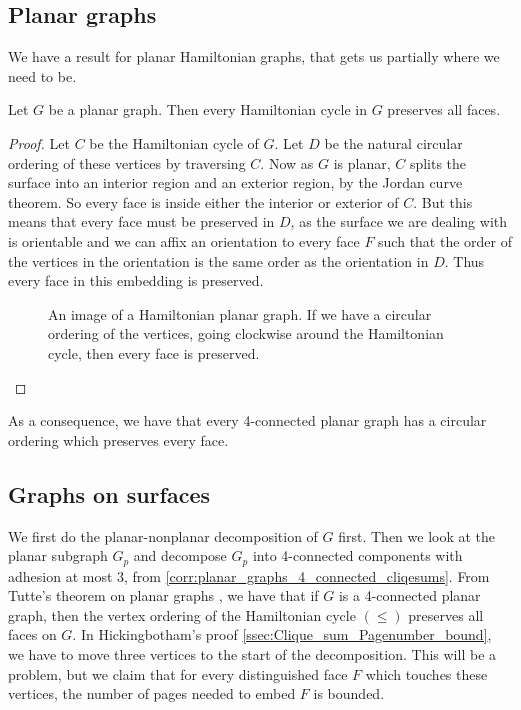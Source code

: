 \subsection{Planar graphs}

We have a result for planar Hamiltonian graphs, that gets us partially where we need to be. 
\begin{theorem}
	Let \(G\) be a planar graph. Then every Hamiltonian cycle in \(G\) preserves all faces. 
\end{theorem}

\begin{proof}
	Let \(C\) be the Hamiltonian cycle of \(G\). Let \(D\) be the natural circular ordering of these vertices by traversing \(C\). Now as \(G\) is planar, \(C\) splits the surface into an interior region and an exterior region, by the Jordan curve theorem. So every face is inside either the interior or exterior of \(C\). But this means that every face must be preserved in \(D\), as the surface we are dealing with is orientable and we can affix an orientation to every face \(F\) such that the order of the vertices in the orientation is the same order as the orientation in \(D\). Thus every face in this embedding is preserved. 
	\begin{figure}
		\centering
		
		\caption{An image of a Hamiltonian planar graph. If we have a circular ordering of the vertices, going clockwise around the Hamiltonian cycle, then every face is preserved.}\label{fig:hamiltonian_planar}
	\end{figure}
\end{proof}
As a consequence, we have that every 4-connected planar graph has a circular ordering which preserves every face. 

\subsection{Graphs on surfaces}

We first do the planar-nonplanar decomposition of \(G\) first. 
Then we look at the planar subgraph \(G_p\) and decompose \(G_p\) into 4-connected components with adhesion at most 3, from \cref{corr:planar_graphs_4_connected_cliqesums}. 
From Tutte's theorem on planar graphs \cite{tutteTheoremPlanarGraphs1956}, we have that if \(G\) is a 4-connected planar graph, then the vertex ordering of the Hamiltonian cycle \((\leq)\) preserves all faces on \(G\).
In Hickingbotham's proof \cref{ssec:Clique_sum_Pagenumber_bound}, we have to move three vertices to the start of the decomposition. This will be a problem, but we claim that for every distinguished face \(F\) which touches these vertices, the number of pages needed to embed \(F\) is bounded. 

